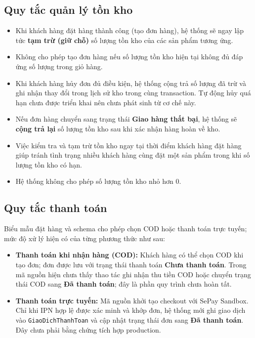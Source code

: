 \subsection{Quy tắc quản lý tồn kho}

\begin{itemize}
\item Khi khách hàng đặt hàng thành công (tạo đơn hàng), hệ thống sẽ ngay lập tức \textbf{tạm trừ (giữ chỗ)} số lượng tồn kho của các sản phẩm tương ứng.
\item Không cho phép tạo đơn hàng nếu số lượng tồn kho hiện tại không đủ đáp ứng số lượng trong giỏ hàng.
\item Khi khách hàng hủy đơn đủ điều kiện, hệ thống cộng trả số lượng đã trừ và ghi nhận thay đổi trong lịch sử kho trong cùng transaction. Tự động hủy quá hạn chưa được triển khai nên chưa phát sinh từ cơ chế này.
\item Nếu đơn hàng chuyển sang trạng thái \textbf{Giao hàng thất bại}, hệ thống sẽ \textbf{cộng trả lại} số lượng tồn kho sau khi xác nhận hàng hoàn về kho.
\item Việc kiểm tra và tạm trừ tồn kho ngay tại thời điểm khách hàng đặt hàng giúp tránh tình trạng nhiều khách hàng cùng đặt một sản phẩm trong khi số lượng tồn kho có hạn.
\item Hệ thống không cho phép số lượng tồn kho nhỏ hơn 0.
\end{itemize}


\subsection{Quy tắc thanh toán}

Biểu mẫu đặt hàng và schema cho phép chọn COD hoặc thanh toán trực tuyến; mức độ xử lý hiện có của từng phương thức như sau:

\begin{itemize}
    \item \textbf{Thanh toán khi nhận hàng (COD):} Khách hàng có thể chọn COD khi tạo đơn; đơn được lưu với trạng thái thanh toán \textbf{Chưa thanh toán}. Trong mã nguồn hiện chưa thấy thao tác ghi nhận thu tiền COD hoặc chuyển trạng thái COD sang \textbf{Đã thanh toán}; đây là phần quy trình chưa hoàn tất.

    \item \textbf{Thanh toán trực tuyến:} Mã nguồn khởi tạo checkout với SePay Sandbox. Chỉ khi IPN hợp lệ được xác minh và khớp đơn, hệ thống mới ghi giao dịch vào \texttt{GiaoDichThanhToan} và cập nhật trạng thái đơn sang \textbf{Đã thanh toán}. Đây chưa phải bằng chứng tích hợp production.
\end{itemize}

